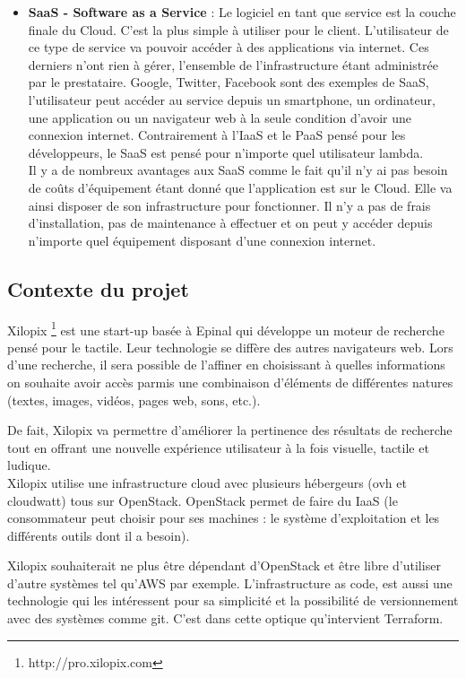 \documentclass[]{article}
\begin{document}
\begin{itemize}
\item \textbf{SaaS - Software as a Service} : Le logiciel en tant que service est la couche finale du Cloud. C'est la plus simple à utiliser pour le client. L'utilisateur de ce type de service va pouvoir accéder à des applications via internet. Ces derniers n'ont rien à gérer, l'ensemble de l'infrastructure étant administrée par le prestataire. Google, Twitter, Facebook sont des exemples de SaaS, l'utilisateur peut accéder au service depuis un smartphone, un ordinateur, une application ou un navigateur web à la seule condition d'avoir une connexion internet. Contrairement à l'IaaS et le PaaS pensé pour les développeurs, le SaaS est pensé pour n'importe quel utilisateur lambda.\\
Il y a de nombreux avantages aux SaaS comme le fait qu'il n'y ai pas besoin de coûts d'équipement étant donné que l'application est sur le Cloud. Elle va ainsi disposer de son infrastructure pour fonctionner. Il n'y a pas de frais d'installation, pas de maintenance à effectuer et on peut y accéder depuis n'importe quel équipement disposant d'une connexion internet.
\end{itemize}

\subsection{Contexte du projet}\label{contexte-du-projet}

Xilopix \footnote{http://pro.xilopix.com} est une start-up basée à Epinal qui
développe un moteur de recherche pensé pour le tactile. Leur
technologie se diffère des autres navigateurs web. Lors d'une
recherche, il sera possible de l'affiner en choisissant à quelles informations on souhaite avoir accès parmis une combinaison d'éléments de différentes natures
(textes, images, vidéos, pages web, sons, etc.).

De fait, Xilopix va permettre d'améliorer la pertinence des
résultats de recherche tout en offrant une nouvelle expérience
utilisateur à la fois visuelle, tactile et ludique.\\
Xilopix utilise une infrastructure cloud avec plusieurs hébergeurs (ovh et cloudwatt) tous sur OpenStack. OpenStack permet de faire du IaaS (le consommateur peut choisir pour ses machines : le système d'exploitation et les différents
outils dont il a besoin). 

Xilopix souhaiterait ne plus être
dépendant d'OpenStack et être libre d'utiliser d'autre systèmes tel qu'AWS par exemple. L'infrastructure as code, est aussi une technologie qui les intéressent pour sa simplicité et la possibilité de versionnement avec des systèmes comme git. C'est dans cette optique qu'intervient Terraform.
\end{document}
